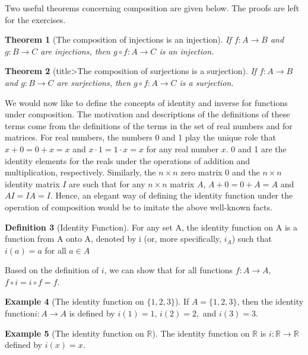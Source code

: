 \documentclass[10pt,]{book}
\theoremstyle{plain}
\newtheorem{theorem}{Theorem}[section]
\theoremstyle{definition}
\newtheorem{definition}[theorem]{Definition}
\theoremstyle{definition}
\newtheorem{example}[theorem]{Example}
\theoremstyle{definition}
\begin{document}
\par
Two useful theorems concerning composition are given below. The proofs are left for the exercises.%
\begin{theorem}[The composition of injections is an injection]\label{theorem-composition-of-injections}
If \(f: A \rightarrow  B\) and \(g : B \rightarrow  C\) are injections, then \(g\circ f : A \rightarrow  C\) is an injection.%
\end{theorem}
\begin{theorem}[title>The composition of surjections is a surjection]\label{theorem-composition-of-surjections}
 If \(f : A \rightarrow  B\) and \(g: B \rightarrow C\) are surjections, then \(g\circ f: A \rightarrow  C\) is a surjection.%
\end{theorem}
\par
We would now like to define the concepts of identity and inverse for functions under composition. The motivation and descriptions of the definitions
of these terms come from the definitions of the terms in the set of real numbers and for matrices. For real numbers, the numbers 0 and 1 play the
unique role that \(x + 0 = 0 + x = x\) and \(x \cdot 1 = 1 \cdot  x = x\) for any real number \(x\).  0 and 1 are the identity elements
for the reals under the operations of addition and multiplication, respectively. Similarly, the \(n \times  n\) zero matrix 0 and the \(n \times
 n\) identity matrix \(I\) are such that for any \(n \times  n\) matrix \(A\), \(A + 0 = 0 + A=A\) and \(A I = I A = I\). Hence, an
elegant way of defining the identity function under the operation of composition would be to imitate the above well-known facts.%
\begin{definition}[Identity Function]\label{def-identity-function}
\label{notation-7}
For any set A, the identity function on A is a function from A onto A, denoted by i (or, more specifically, \(i_A\)) such that \(i(a) = a\)  for all \(a\in A\)%
\end{definition}
\par
Based on the definition of \(i\), we can show that for all functions \(f:A\to A\), \(f\circ i=i\circ f = f\).%
\begin{example}[The identity function on \(\{1,2,3\}\)]\label{ex-an-identity-function}
 If \(A = \{1, 2, 3\}\), then the identity function\(i : A \to  A\) is defined by \(i(1) = 1\), \(i(2) = 2,\) and \(i(3)= 3\).%
\end{example}
\begin{example}[The identity function on \(\mathbb{R}\)]\label{ex-identity-on-reals}
The identity function on \(\mathbb{R}\) is \(i : \mathbb{R} \rightarrow  \mathbb{R}\) defined by \(i(x) = x\).%
\end{example}
\typeout{************************************************}
\typeout{************************************************}
\end{document}
